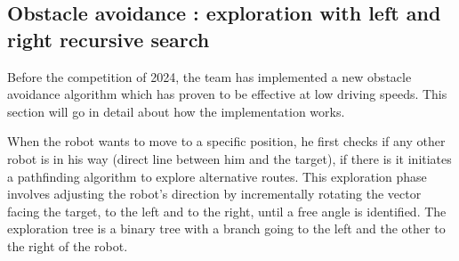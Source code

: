 \subsection{Obstacle avoidance : exploration with left and right recursive search}
Before the competition of 2024, the team has implemented a new obstacle avoidance algorithm which has
proven to be effective at low driving speeds. This section will go in detail about how the implementation works.

When the robot wants to move to a specific position, he first checks if any other robot is in his way (direct line between him and the target), if there is it initiates a pathfinding algorithm to explore alternative routes. This exploration phase involves adjusting the robot’s direction by incrementally rotating the vector facing the target, to the left and to the right, until a free angle is identified. The exploration tree is a binary tree with a branch going to the left and the other to the right of the robot.

